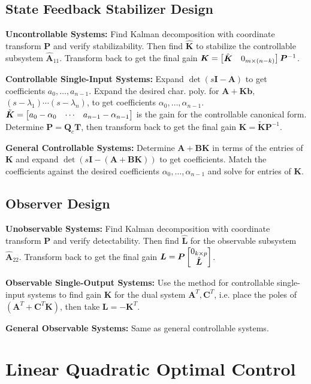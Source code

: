 \documentclass[twocolumn, 8pt]{extarticle}
\begin{document}
\subsection{State Feedback Stabilizer Design}

\textbf{Uncontrollable Systems:} Find Kalman decomposition with coordinate transform \(\bm P\) and
verify stabilizability. Then find \(\hat{\bm K}\) to stabilize the controllable subsystem \(\hat{\bm A}_{11}\).
Transform back to get the final gain \(\bm K = \rvec{\hat{\bm K}}{0_{m \times (n - k)}}\bm P^{-1}\).

\textbf{Controllable Single-Input Systems:} Expand \(\det(s\bm I - \bm A)\) to get coefficients \(a_0, \dots, a_{n - 1}\).
Expand the desired char. poly. for \(\bm A + \bm K\bm b\), \((s - \lambda _1)\cdots(s - \lambda _n)\), to get
coefficients \(\alpha _0, \dots, \alpha _{n - 1}\). \(\tilde{\bm K} = \rvec{a_0 - \alpha _0}{\cdots}{a_{n - 1} - \alpha _{n - 1}}\)
is the gain for the controllable canonical form. Determine \(\bm P = \bm Q_c\bm T\), then transform back to get the
final gain \(\bm K = \tilde{\bm K}\bm P^{-1}\).

\textbf{General Controllable Systems:} Determine \(\bm A + \bm B\bm K\) in terms of the entries of \(\bm K\) and expand
\(\det(s\bm I - (\bm A + \bm B\bm K))\) to get coefficients. Match the coefficients against the desired coefficients
\(\alpha _0, \dots, \alpha _{n - 1}\) and solve for entries of \(\bm K\).

\subsection{Observer Design}

\textbf{Unobservable Systems:} Find Kalman decomposition with coordinate transform \(\bm P\) and
verify detectability. Then find \(\hat{\bm L}\) for the observable subsystem \(\hat{\bm A}_{22}\).
Transform back to get the final gain \(\bm L = \bm P\cvec{0_{k \times p}}{\hat{\bm L}}\).

\textbf{Observable Single-Output Systems:} Use the method for controllable single-input systems to find gain \(\bm K\)
for the dual system \(\bm A^T, \bm C^T\), i.e. place the poles of \((\bm A^T + \bm C^T\bm K)\), then take
\(\bm L = -\bm K^T\).

\textbf{General Observable Systems:} Same as general controllable systems.

\section{Linear Quadratic Optimal Control}
\end{document}
